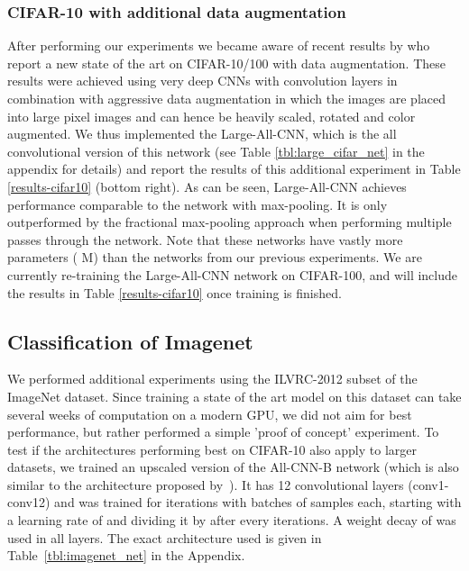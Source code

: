 \documentclass{article} \usepackage{iclr2015,times}
\begin{document}
\subsubsection{CIFAR-10 with additional data augmentation}
After performing our experiments we became aware of recent results by \citet{Graham2015} who report
a new state of the art on CIFAR-10/100 with data augmentation. These results 
were achieved using very deep CNNs with  convolution layers in combination with aggressive data augmentation 
in which the  images are placed into large  pixel images and can hence be 
heavily scaled, rotated and color augmented. We thus implemented the Large-All-CNN, which is the all convolutional version of this network (see Table \ref{tbl:large_cifar_net} in the appendix for details) and 
report the results of this additional experiment in Table \ref{results-cifar10} (bottom right).
As can be seen, Large-All-CNN achieves performance comparable to the network with max-pooling. 
It is only outperformed by the fractional max-pooling approach when performing multiple passes through the network. Note
that these networks have vastly more parameters ( M) than the
networks from our previous experiments.
We are currently re-training the Large-All-CNN network on CIFAR-100,
and will include the results in Table \ref{results-cifar10} once training is finished. 

\subsection{Classification of Imagenet}
We performed additional experiments using the ILVRC-2012 subset of the ImageNet dataset. Since training a state of the art model on this dataset can take several weeks of computation on a modern GPU, we did not aim for best performance, but rather performed a simple 'proof of concept' experiment. To test if the architectures performing best on CIFAR-10 also apply to larger datasets, we trained an upscaled version of the All-CNN-B network (which is also similar to the architecture proposed by~\citet{Lin_2014}). It has 12 convolutional layers (conv1-conv12) and was trained for  iterations with batches of  samples each, starting with a learning rate of  and dividing it by  after every  iterations. A weight decay of  was used in all layers. The exact architecture used is given in Table~\ref{tbl:imagenet_net} in the Appendix.
\end{document}
